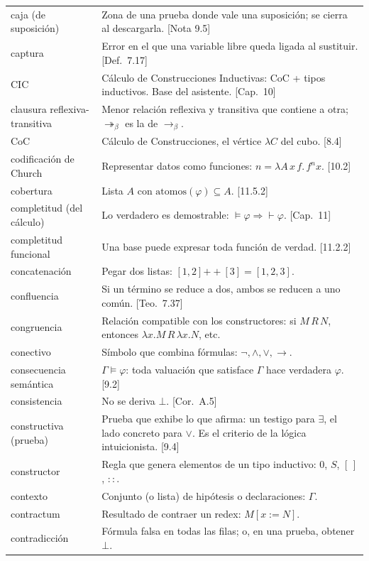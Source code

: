 \documentclass[11pt,a4paper]{article}
\newcommand{\bred}{\rightarrow_\beta}
\newcommand{\bmred}{\twoheadrightarrow_\beta}
\newcommand{\concat}{\mathbin{+\!\!+}}
\begin{document}
{\begin{longtable}{@{}p{}p{}@{}}
caja (de suposición) & Zona de una prueba donde vale una suposición; se cierra al descargarla. [Nota 9.5]\\
captura & Error en el que una variable libre queda ligada al sustituir. [Def.\ 7.17]\\
CIC & Cálculo de Construcciones Inductivas: CoC + tipos inductivos. Base del asistente. [Cap.\ 10]\\
clausura reflexiva-transitiva & Menor relación reflexiva y transitiva que contiene a otra; \(\bmred\) es la de \(\bred\).\\
CoC & Cálculo de Construcciones, el vértice \(\lambda C\) del cubo. [8.4]\\
codificación de Church & Representar datos como funciones: \(n=\lambda A\,x\,f.\,f^nx\). [10.2]\\
cobertura & Lista \(A\) con \(\mathrm{atomos}(\varphi)\subseteq A\). [11.5.2]\\
completitud (del cálculo) & Lo verdadero es demostrable: \(\models\varphi\Rightarrow\vdash\varphi\). [Cap.\ 11]\\
completitud funcional & Una base puede expresar toda función de verdad. [11.2.2]\\
concatenación & Pegar dos listas: \([1,2]\concat[3]=[1,2,3]\).\\
confluencia & Si un término se reduce a dos, ambos se reducen a uno común. [Teo.\ 7.37]\\
congruencia & Relación compatible con los constructores: si \(M\,R\,N\), entonces \(\lambda x.M\,R\,\lambda x.N\), etc.\\
conectivo & Símbolo que combina fórmulas: \(\neg,\wedge,\vee,\to\).\\
consecuencia semántica & \(\Gamma\models\varphi\): toda valuación que satisface \(\Gamma\) hace verdadera \(\varphi\). [9.2]\\
consistencia & No se deriva \(\bot\). [Cor.\ A.5]\\
constructiva (prueba) & Prueba que exhibe lo que afirma: un testigo para \(\exists\), el lado concreto para \(\vee\). Es el criterio de la lógica intuicionista. [9.4]\\
constructor & Regla que genera elementos de un tipo inductivo: \(0\), \(S\), \([\,]\), \(::\).\\
contexto & Conjunto (o lista) de hipótesis o declaraciones: \(\Gamma\).\\
contractum & Resultado de contraer un redex: \(M[x:=N]\).\\
contradicción & Fórmula falsa en todas las filas; o, en una prueba, obtener \(\bot\).\\

\end{longtable}}
\end{document}
